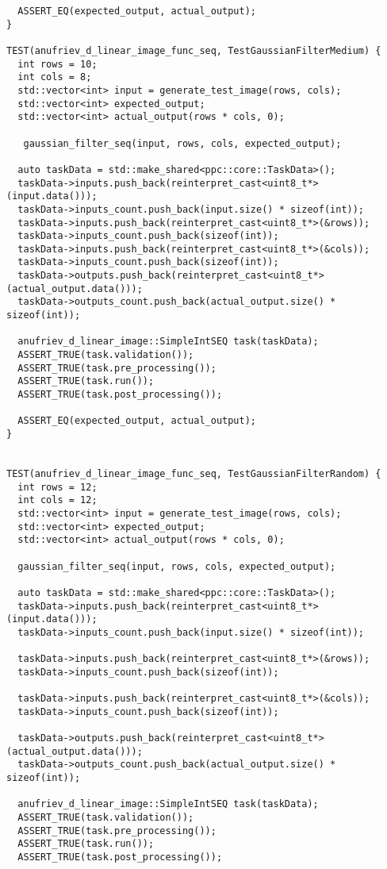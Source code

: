 \documentclass[12pt]{article}
\begin{document}
\begin{lstlisting}
  ASSERT_EQ(expected_output, actual_output);
}

TEST(anufriev_d_linear_image_func_seq, TestGaussianFilterMedium) {
  int rows = 10;
  int cols = 8;
  std::vector<int> input = generate_test_image(rows, cols);
  std::vector<int> expected_output;
  std::vector<int> actual_output(rows * cols, 0);

   gaussian_filter_seq(input, rows, cols, expected_output);

  auto taskData = std::make_shared<ppc::core::TaskData>();
  taskData->inputs.push_back(reinterpret_cast<uint8_t*>(input.data()));
  taskData->inputs_count.push_back(input.size() * sizeof(int));
  taskData->inputs.push_back(reinterpret_cast<uint8_t*>(&rows));
  taskData->inputs_count.push_back(sizeof(int));
  taskData->inputs.push_back(reinterpret_cast<uint8_t*>(&cols));
  taskData->inputs_count.push_back(sizeof(int));
  taskData->outputs.push_back(reinterpret_cast<uint8_t*>(actual_output.data()));
  taskData->outputs_count.push_back(actual_output.size() * sizeof(int));

  anufriev_d_linear_image::SimpleIntSEQ task(taskData);
  ASSERT_TRUE(task.validation());
  ASSERT_TRUE(task.pre_processing());
  ASSERT_TRUE(task.run());
  ASSERT_TRUE(task.post_processing());
    
  ASSERT_EQ(expected_output, actual_output);
}


TEST(anufriev_d_linear_image_func_seq, TestGaussianFilterRandom) {
  int rows = 12;
  int cols = 12;
  std::vector<int> input = generate_test_image(rows, cols);
  std::vector<int> expected_output;
  std::vector<int> actual_output(rows * cols, 0);

  gaussian_filter_seq(input, rows, cols, expected_output);

  auto taskData = std::make_shared<ppc::core::TaskData>();
  taskData->inputs.push_back(reinterpret_cast<uint8_t*>(input.data()));
  taskData->inputs_count.push_back(input.size() * sizeof(int));
    
  taskData->inputs.push_back(reinterpret_cast<uint8_t*>(&rows));
  taskData->inputs_count.push_back(sizeof(int));
  
  taskData->inputs.push_back(reinterpret_cast<uint8_t*>(&cols));
  taskData->inputs_count.push_back(sizeof(int));
  
  taskData->outputs.push_back(reinterpret_cast<uint8_t*>(actual_output.data()));
  taskData->outputs_count.push_back(actual_output.size() * sizeof(int));

  anufriev_d_linear_image::SimpleIntSEQ task(taskData);
  ASSERT_TRUE(task.validation());
  ASSERT_TRUE(task.pre_processing());
  ASSERT_TRUE(task.run());
  ASSERT_TRUE(task.post_processing());


\end{lstlisting}
\end{document}
